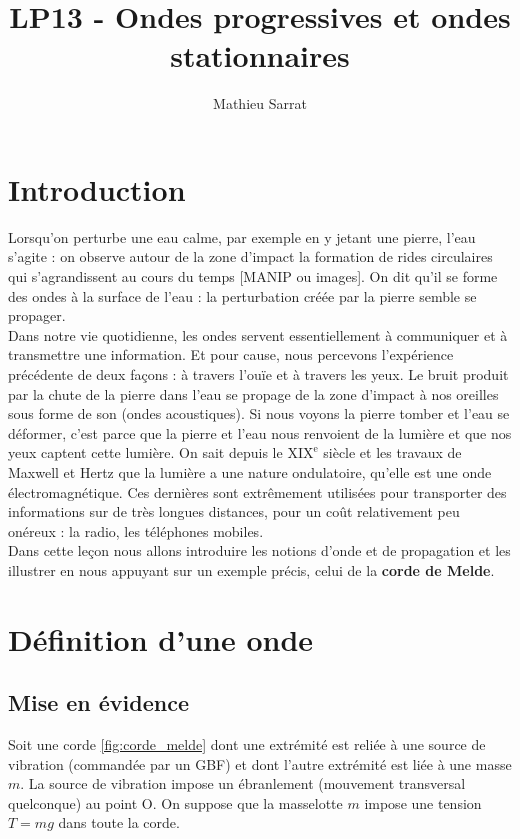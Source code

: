 \documentclass[11pt,a4paper]{report}
\author{Mathieu Sarrat}
\title{LP13 - Ondes progressives et ondes stationnaires}
\begin{document}
\maketitle

\section{Introduction}

Lorsqu'on perturbe une eau calme, par exemple en y jetant une pierre, l'eau s'agite : on observe autour de la zone d'impact la formation de rides circulaires qui s'agrandissent au cours du temps [MANIP ou images]. On dit qu'il se forme des ondes à la surface de l'eau : la perturbation créée par la pierre semble se propager.\\

Dans notre vie quotidienne, les ondes servent essentiellement à communiquer et à transmettre une information. Et pour cause, nous percevons l'expérience précédente de deux façons : à travers l'ouïe et à travers les yeux. Le bruit produit par la chute de la pierre dans l'eau se propage de la zone d'impact à nos oreilles sous forme de son (ondes acoustiques). Si nous voyons la pierre tomber et l'eau se déformer, c'est parce que la pierre et l'eau nous renvoient de la lumière et que nos yeux captent cette lumière. On sait depuis le $\text{XIX}^\text{e}$ siècle et les travaux de Maxwell et Hertz que la lumière a une nature ondulatoire, qu'elle est une onde électromagnétique. Ces dernières sont extrêmement utilisées pour transporter des informations sur de très longues distances, pour un coût relativement peu onéreux : la radio, les téléphones mobiles.\\

Dans cette leçon nous allons introduire les notions d'onde et de propagation et les illustrer en nous appuyant sur un exemple précis, celui de la \textbf{corde de Melde}. 

\section{Définition d'une onde}\label{sec:1}

\subsection{Mise en évidence}

Soit une corde \ref{fig:corde_melde} dont une extrémité est reliée à une source de vibration (commandée par un GBF) et dont l'autre extrémité est liée à une masse $m$. La source de vibration impose un ébranlement (mouvement transversal quelconque) au point O. On suppose que la masselotte $m$ impose une tension $T = mg$ dans toute la corde.\\
\end{document}
